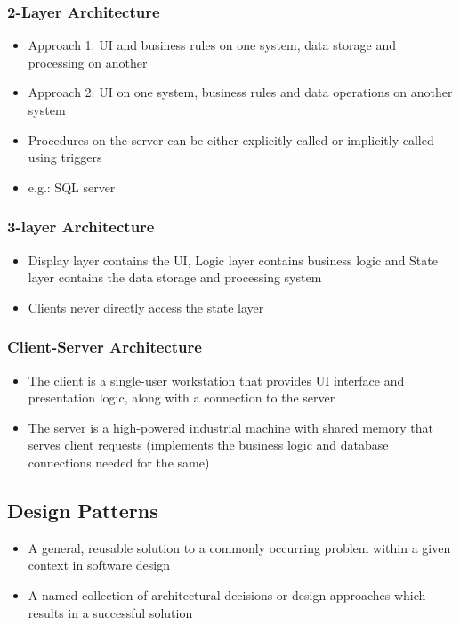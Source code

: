 \documentclass{article}
\begin{document}
\subsubsection{2-Layer Architecture}
\begin{itemize}
    \item Approach 1: UI and business rules on one system, data storage and processing on another
    
    \item Approach 2: UI on one system, business rules and data operations on another system 
    
    \item Procedures on the server can be either explicitly called or implicitly called using triggers
    
    \item e.g.: SQL server 
\end{itemize}

\subsubsection{3-layer Architecture}
\begin{itemize}
    \item Display layer contains the UI, Logic layer contains business logic and State layer contains the data storage and processing system
    
    \item Clients never directly access the state layer
\end{itemize}

\subsubsection{Client-Server Architecture}
\begin{itemize}
    \item The client is a single-user workstation that provides UI interface and presentation logic, along with a connection to the server
    
    \item The server is a high-powered industrial machine with shared memory that serves client requests (implements the business logic and database connections needed for the same)
\end{itemize}

\subsection{Design Patterns}
\begin{itemize}
    \item A general, reusable solution to a commonly occurring problem within a given context in software design
    
    \item A named collection of architectural decisions or design approaches which results in a successful solution
\end{itemize}
\end{document}
